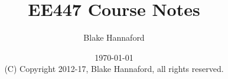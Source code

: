 \documentclass[letterpaper]{book}
\begin{document}
\setpagewiselinenumbers        %
\modulolinenumbers[5]


\frontmatter

\title{EE447 Course Notes}

\author{Blake Hannaford}

\date{\today\\(C) Copyright 2012-17, Blake Hannaford, all rights reserved. }

\maketitle

\tableofcontents

\mainmatter

\linenumbers

\newpage
% 
% 
 
\appendix
%
% 

\backmatter
%
\label{LastPage}
\end{document}
